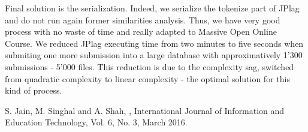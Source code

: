 \documentclass[twoside]{article}
\begin{document}
\begin{multicols*}{2}
Final solution is the serialization. Indeed, we serialize the tokenize part of JPlag and do not run again former similarities analysis. Thus, we have very good process with no waste of time and really adapted to Massive Open Online Course. We reduced JPlag executing time from two minutes to five seconds when submiting one more submission into a large database with approximatively 1'300 submissions - 5'000 files. This reduction is due to the complexity sag, switched from quadratic complexity to linear complexity - the optimal solution for this kind of process.



\vspace{0.5cm}
\begin{thebibliography}{99} %

\bibitem[1]{}
S. Jain, M. Singhal and A. Shah,
, International Journal of Information and Education Technology, Vol. 6, No. 3, March 2016.
 
\end{thebibliography}


\end{multicols*}
\end{document}
